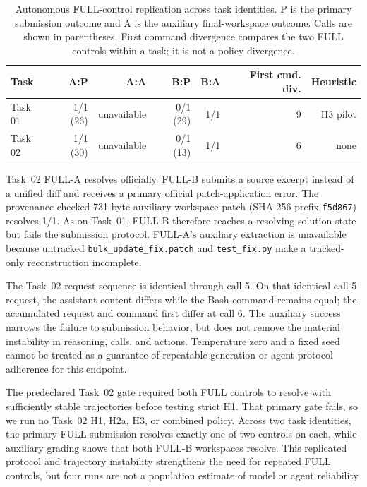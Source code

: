 \documentclass[11pt]{article}
\begin{document}
\begin{table}[H]
\centering
\scriptsize
\caption{Autonomous FULL-control replication across task identities. P is the
primary submission outcome and A is the auxiliary final-workspace outcome.
Calls are shown in parentheses. First command divergence compares the two FULL
controls within a task; it is not a policy divergence.}
\label{tab:full-control-replication}
\begin{tabular}{lrrrrrr}
\toprule
Task & A:P & A:A & B:P & B:A & First cmd. div. & Heuristic \\
\midrule
Task 01 & 1/1 (26) & unavailable & 0/1 (29) & 1/1 & 9 & H3 pilot \\
Task 02 & 1/1 (30) & unavailable & 0/1 (13) & 1/1 & 6 & none \\
\bottomrule
\end{tabular}
\end{table}

Task~02 FULL-A resolves officially. FULL-B submits a source excerpt instead of
a unified diff and receives a primary official patch-application error. The
provenance-checked 731-byte auxiliary workspace patch (SHA-256 prefix
\texttt{f5d867}) resolves 1/1. As on Task~01, FULL-B therefore reaches a
resolving solution state but fails the submission protocol. FULL-A's auxiliary
extraction is unavailable because untracked \texttt{bulk\_update\_fix.patch}
and \texttt{test\_fix.py} make a tracked-only reconstruction incomplete.

The Task~02 request sequence is identical through call 5. On that identical
call-5 request, the assistant content differs while the Bash command remains
equal; the accumulated request and command first differ at call 6. The
auxiliary success narrows the failure to submission behavior, but does not
remove the material instability in reasoning, calls, and actions. Temperature
zero and a fixed seed cannot be treated as a guarantee of repeatable generation
or agent protocol adherence for this endpoint.

The predeclared Task~02 gate required both FULL controls to resolve with
sufficiently stable trajectories before testing strict H1. That primary gate
fails, so we run no Task~02 H1, H2a, H3, or combined policy. Across two task
identities, the primary FULL submission resolves exactly one of two controls on
each, while auxiliary grading shows that both FULL-B workspaces resolve. This
replicated protocol and trajectory instability strengthens the need for
repeated FULL controls, but four runs are not a population estimate of model or
agent reliability.
\end{document}
